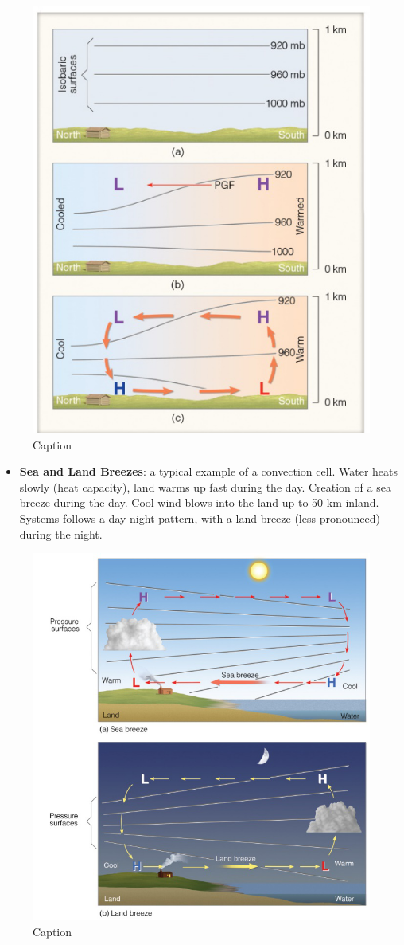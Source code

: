 \documentclass[oneside]{book}
\providecommand{\tightlist}{%
  \setlength{\itemsep}{0pt}\setlength{\parskip}{0pt}}
\begin{document}
\begin{figure}

{\centering \includegraphics[width=0.6\linewidth]{figures/Figure424} 

}

\caption{Caption}\label{fig:ThermalCirc}
\end{figure}

\begin{itemize}
\tightlist
\item
  \textbf{Sea and Land Breezes}: a typical example of a convection cell.
  Water heats slowly (heat capacity), land warms up fast during the day.
  Creation of a sea breeze during the day. Cool wind blows into the land
  up to 50 km inland. Systems follows a day-night pattern, with a land
  breeze (less pronounced) during the night.
\end{itemize}

\begin{figure}

{\centering \includegraphics[width=0.6\linewidth]{figures/Figure425} 

}

\caption{Caption}\label{fig:Breezes}
\end{figure}
\end{document}
